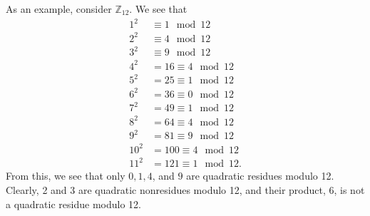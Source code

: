 \documentclass[12 pt]{amsart}
\begin{document}
  As an example, consider $\mathbb{Z}_{12}$. 
  We see that 
  \begin{align*}
    1^2 &\equiv 1 \mod 12 \\
    2^2 &\equiv 4 \mod 12 \\
    3^2 &\equiv 9 \mod 12 \\
    4^2 &= 16 \equiv 4 \mod 12 \\
    5^2 &= 25 \equiv 1 \mod 12 \\
    6^2 &= 36 \equiv 0 \mod 12 \\
    7^2 &= 49 \equiv 1 \mod 12 \\
    8^2 &= 64 \equiv 4 \mod 12 \\
    9^2 &= 81 \equiv 9 \mod 12 \\
    10^2 &= 100 \equiv 4 \mod 12 \\
    11^2 &= 121 \equiv 1 \mod 12.
  \end{align*}
  From this, we see that only $0, 1, 4$, and $9$
  are quadratic residues modulo 12.
  Clearly, 2 and 3 are quadratic nonresidues modulo 12,
  and their product, 6, is not a quadratic residue modulo 12.
\vfill
\end{document}
